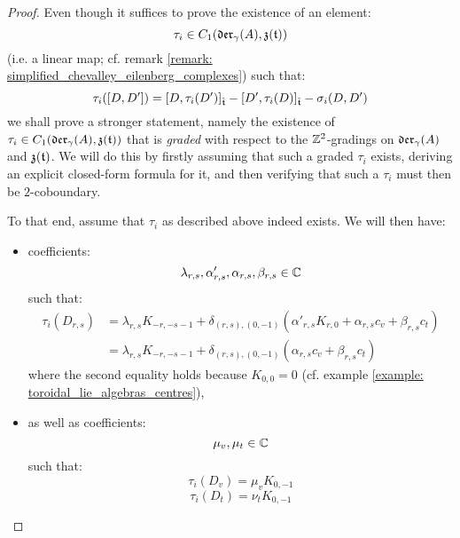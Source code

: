             \begin{proof}
                Even though it suffices to prove the existence of an element:
                    $$\tau_i \in C_1(\mathfrak{der}_{\gamma}(A), \mathfrak{z}(\mathfrak{t}))$$
                (i.e. a linear map; cf. remark \ref{remark: simplified_chevalley_eilenberg_complexes}) such that:
                    $$\tau_i([D, D']) = [D, \tau_i(D')]_{\hat{\mathfrak{t}}} - [D', \tau_i(D)]_{\hat{\mathfrak{t}}} - \sigma_i(D, D')$$
                we shall prove a stronger statement, namely the existence of $\tau_i \in C_1(\mathfrak{der}_{\gamma}(A), \mathfrak{z}(\mathfrak{t}))$ that is \textit{graded} with respect to the $\mathbb{Z}^2$-gradings on $\mathfrak{der}_{\gamma}(A)$ and $\mathfrak{z}(\mathfrak{t})$. We will do this by firstly assuming that such a graded $\tau_i$ exists, deriving an explicit closed-form formula for it, and then verifying that such a $\tau_i$ must then be $2$-coboundary.

                To that end, assume that $\tau_i$ as described above indeed exists. We will then have:
                \begin{itemize}
                    \item coefficients:
                        $$\lambda_{r, s}, \alpha'_{r, s}, \alpha_{r, s}, \beta_{r, s} \in \mathbb{C}$$
                    such that:
                        $$
                            \begin{aligned}
                                \tau_i(D_{r, s}) & = \lambda_{r, s} K_{-r, -s - 1} + \delta_{(r, s), (0, -1)} ( \alpha'_{r, s} K_{r, 0} + \alpha_{r, s} c_v + \beta_{r, s} c_t )
                                \\
                                & = \lambda_{r, s} K_{-r, -s - 1} + \delta_{(r, s), (0, -1)} ( \alpha_{r, s} c_v + \beta_{r, s} c_t )
                            \end{aligned}
                        $$
                    where the second equality holds because $K_{0, 0} = 0$ (cf. example \ref{example: toroidal_lie_algebras_centres}), 
                    \item as well as coefficients:
                        $$\mu_v, \mu_t \in \mathbb{C}$$
                    such that:
                        $$\tau_i(D_v) = \mu_v K_{0, -1}$$
                        $$\tau_i(D_t) = \nu_t K_{0, -1}$$
                \end{itemize}
                

\end{proof}
